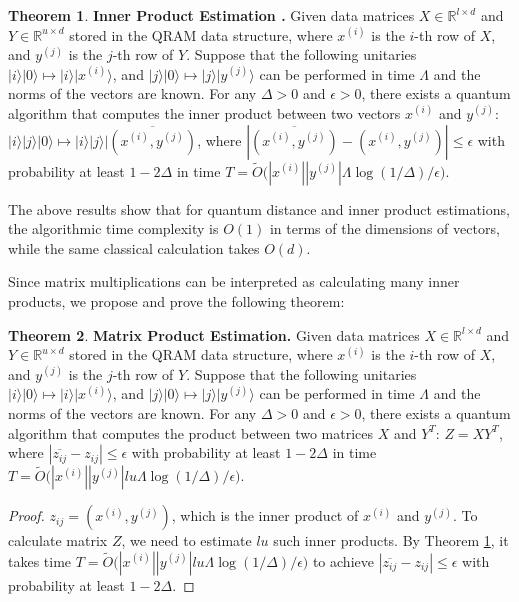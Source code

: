 \documentclass[11pt]{article}
\theoremstyle{definition}
\newtheorem{theorem}{Theorem}[section]
\def\xsi{x^{(i)}}
\def\ysj{y^{(j)}}
\begin{document}
\begin{theorem}\label{inner}
\textbf{Inner Product Estimation \cite{QRAM, kerenidis2018q}.}
Given data matrices $X \in \mathbb{R}^{l \times d}$ and $Y \in \mathbb{R}^{u \times d}$ stored in the QRAM data structure, where $\xsi$ is the $i$-th row of $X$, and $\ysj$ is the $j$-th row of $Y$. 
Suppose that the following unitaries $|i\rangle |0\rangle \mapsto |i\rangle |\xsi\rangle$, and $|j\rangle |0\rangle \mapsto |j\rangle |\ysj\rangle$ can be performed in time $\Lambda$ and the norms of the vectors are known. For any $\Delta > 0$ and $\epsilon > 0$, there exists a quantum algorithm that computes the inner product between two vectors $\xsi$ and $\ysj$:
$|i\rangle |j\rangle |0\rangle \mapsto |i\rangle |j\rangle |\overline{(\xsi, \ysj)}$, where $|\overline{(\xsi, \ysj)} - (\xsi, \ysj)| \leq \epsilon$ with probability at least $1 - 2 \Delta$ in time $T = \tilde{O}\Big(|\xsi||\ysj| \Lambda \log(1/\Delta) / \epsilon \Big)$.
\end{theorem}

The above results show that for quantum distance and inner product estimations, the algorithmic time complexity is $O(1)$ in terms of the dimensions of vectors, while the same classical calculation takes $O(d)$. 

Since matrix multiplications can be interpreted as calculating many inner products, we propose and prove the following theorem:

\begin{theorem}
\textbf{Matrix Product Estimation.}
Given data matrices $X \in \mathbb{R}^{l \times d}$ and $Y \in \mathbb{R}^{u \times d}$ stored in the QRAM data structure, where $\xsi$ is the $i$-th row of $X$, and $\ysj$ is the $j$-th row of $Y$. 
Suppose that the following unitaries $|i\rangle |0\rangle \mapsto |i\rangle |\xsi\rangle$, and $|j\rangle |0\rangle \mapsto |j\rangle |\ysj\rangle$ can be performed in time $\Lambda$ and the norms of the vectors are known. For any $\Delta > 0$ and $\epsilon > 0$, there exists a quantum algorithm that computes the product between two matrices $X$ and $Y^T$: $Z = X Y^T$, where $|\overline{z_{i j}} - z_{i j}| \leq \epsilon$ with probability at least $1 - 2 \Delta$ in time $T = \tilde{O}\Big(|\xsi||\ysj| l u \Lambda \log(1/\Delta) / \epsilon \Big)$.
\end{theorem}

\begin{proof} 
$z_{i j} = (\xsi, \ysj)$, which is the inner product of $\xsi$ and $\ysj$. To calculate matrix $Z$, we need to estimate $l u$ such inner products. By Theorem \ref{inner}, it takes time  $T = \tilde{O}\Big(|\xsi||\ysj| l u \Lambda \log(1/\Delta) / \epsilon \Big)$ to achieve $|\overline{z_{i j}} - z_{i j}| \leq \epsilon$ with probability at least $1 - 2 \Delta$.
\end{proof}
\end{document}
